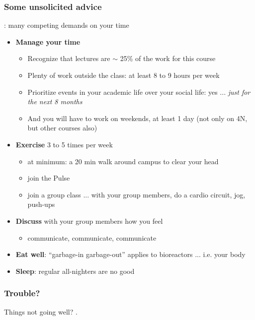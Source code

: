 \begin{frame}\frametitle{Some unsolicited advice}
	\begin{exampleblock}{}
		{} : many competing demands on your time
	\end{exampleblock}	
	\begin{itemize}		
		\item	\textbf{Manage your time}
		\begin{itemize}
			\item	Recognize that lectures are $\sim$ 25\% of the work for this course
			\item	Plenty of work outside the class: at least 8 to 9 hours per week
			\item	Prioritize events in your academic life over your social life: yes ... \emph{just for the next 8 months}
			\item	And you will have to work on weekends, at least 1 day (not only on 4N, but other courses also)
		\end{itemize}
		\pause
		\item	\textbf{Exercise} 3 to 5 times per week
		\begin{itemize}
			\item	at minimum: a 20 min walk around campus to clear your head
			\item	join the Pulse
			\item	join a group class ... with your group members, do a cardio circuit, jog, push-ups
		\end{itemize}		
		\pause
		\item	\textbf{Discuss} with your group members how you feel
		\begin{itemize}
			\item	communicate, communicate, communicate
		\end{itemize}
		\item	\textbf{Eat well}: ``garbage-in garbage-out'' applies to bioreactors ... i.e. your body
		\item	\textbf{Sleep}: regular all-nighters are no good
	\end{itemize}	
\end{frame}

\begin{frame}\frametitle{Trouble?}
	\begin{exampleblock}{}
		\vspace{12pt}
		Things not going well? {}.
		\vspace{12pt}
	\end{exampleblock}
\end{frame}

